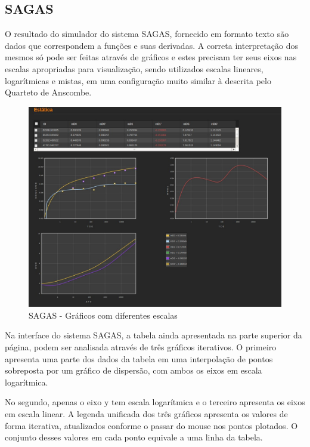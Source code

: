 \documentclass[]{article}
\begin{document}
\subsection{SAGAS}

O resultado do simulador do sistema SAGAS, fornecido em formato texto são dados que correspondem a funções e suas derivadas. A correta interpretação dos mesmos só pode ser feitas através de gráficos e estes precisam ter seus eixos nas escalas apropriadas para visualização, sendo utilizados escalas lineares, logarítmicas e mistas, em uma configuração muito similar à descrita pelo Quarteto de Anscombe.

\begin{figure}[!ht]
\centering
\includegraphics[scale=.3]{./sagas}
\caption{SAGAS - Gráficos com diferentes escalas}
\label{fig:sagas}
\end{figure}


Na interface do sistema SAGAS, a tabela ainda apresentada na parte superior da página, podem ser analisada através de três gráficos iterativos. O primeiro apresenta uma parte dos dados da tabela em uma interpolação de pontos sobreposta por um gráfico de dispersão, com ambos os eixos em escala logarítmica. 

No segundo, apenas o eixo y tem escala logarítmica e o terceiro apresenta os eixos em escala linear. A legenda unificada dos três gráficos apresenta os valores de forma iterativa, atualizados conforme o passar do mouse nos pontos plotados. O conjunto desses valores em cada ponto equivale a uma linha da tabela.
\end{document}
